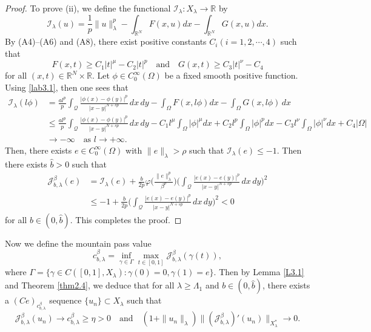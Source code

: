 \documentclass[10pt,a4paper]{amsart}
\numberwithin{equation}{section}
\begin{document}
\begin{proof}
To prove (ii), we define the functional $\mathcal{I}_\lambda: X_\lambda\to  \mathbb{R}$ 
by
$$
\mathcal{I}_\lambda(u)=\frac{1}{p} \|u\|^p_\lambda
-\int_{\mathbb{R}^N}F(x,u)dx-\int_{\mathbb{R}^N}G(x,u)dx.
$$
By (A4)--(A6) and (A8), there exist positive constants $C_i(i=1, 2, \cdots,4)$
such that
\begin{equation}\label{lab3.1}
F(x,t)\geq C_1|t|^\mu- C_2|t|^p \quad \text{and}\quad G(x,t)\geq C_3|t|^\nu-C_4
\end{equation}
for all $(x,t)\in \mathbb R^N\times \mathbb R$.
Let $\phi\in C^\infty_0(\Omega)$ be a fixed smooth positive function. 
Using \eqref{lab3.1}, then one sees that
\begin{align*}
\mathcal{I}_\lambda(l\phi)
&= \frac{al^p}{p}\int_{\mathcal{Q}}\frac{|\phi(x)-\phi(y)|^p}{|x-y|^{N+sp}}\,dx\,dy
 -\int_{\Omega}F(x, l\phi)dx-\int_{\Omega}G(x,l\phi)\,dx  \\
&\leq \frac{al^p}{p}\int_{\mathcal{Q}}\frac{|\phi(x)-\phi(y)|^p}{|x-y|^{N+sp}}\,dx\,dy
 -C_1l^\mu\int_{\Omega}|\phi|^\mu dx+C_2l^p\int_{\Omega}|\phi|^pdx  
 -C_3l^\nu\int_{\Omega}|\phi|^\nu dx+C_4|\Omega|     \\
&\to -\infty\quad \text{as } l\to  +\infty.
\end{align*}
Then, there exists $e\in C^\infty_0(\Omega)$ with $\|e\|_\lambda>\rho$ such 
that $\mathcal{I}_\lambda(e)\leq -1$. 
Then there exists $\widehat{b}>0$ such that
\begin{align*}
 \mathcal{J}^\beta_{b,\lambda}(e)
&=\mathcal{I}_\lambda(e)+\frac{b}{2p}\varphi\Big( \frac{\|e\|^p_\lambda}{\beta^p}
 \Big)\Big(\int_{\mathcal{Q}}\frac{|e(x)-e(y)|^p}{|x-y|^{N+sp}}\,dx\,dy\Big)^2    \\
&\leq -1+\frac{b}{2p}\Big(\int_{\mathcal{Q}}\frac{|e(x)-e(y)|^p}{|x-y|^{N+sp}}\,dx\,dy
\Big)^2   <0
\end{align*}
for all $b\in(0, \widehat{b})$. This completes the proof.
\end{proof}

Now we define the mountain pass value
$$
c_{b,\lambda}^\beta=\inf_{\gamma\in\Gamma} 
\max_{t\in[0,1]}\mathcal{J}^\beta_{b,\lambda}(\gamma(t)),
$$
where $\Gamma=\{\gamma\in C([0,1], X_\lambda):\gamma(0)=0,\gamma(1)=e\}$. 
Then by Lemma \ref{L3.1} and Theorem \ref{thm2.4}, we deduce that for all 
$\lambda\geq\Lambda_1$ and $b\in(0, \widehat{b})$, there exists a 
$(Ce)_{c_{b,\lambda}^\beta}$ sequence $\{u_n\}\subset X_\lambda$ such that
\begin{equation}\label{lab3.2}
 \mathcal{J}^\beta_{b,\lambda}(u_n)\to  c_{b,\lambda}^\beta\geq \eta>0\quad
  \text{and}\quad (1+\|u_n\|_\lambda)\|(\mathcal{J}^\beta_{b,\lambda})'(u_n)
  \|_{X_\lambda^*}\to  0.
\end{equation}
\end{document}
